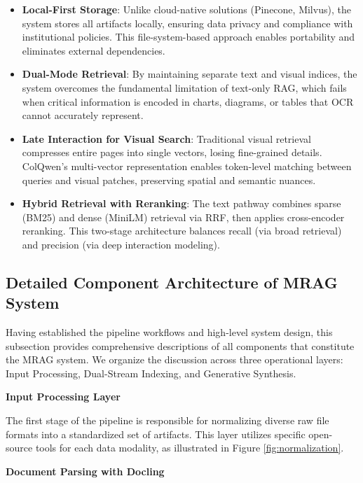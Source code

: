 \begin{itemize}
    \item \textbf{Local-First Storage}: Unlike cloud-native solutions (Pinecone, Milvus), the system stores all artifacts locally, ensuring data privacy and compliance with institutional policies. This file-system-based approach enables portability and eliminates external dependencies.
    
    \item \textbf{Dual-Mode Retrieval}: By maintaining separate text and visual indices, the system overcomes the fundamental limitation of text-only RAG, which fails when critical information is encoded in charts, diagrams, or tables that OCR cannot accurately represent.
    
    \item \textbf{Late Interaction for Visual Search}: Traditional visual retrieval compresses entire pages into single vectors, losing fine-grained details. ColQwen's multi-vector representation enables token-level matching between queries and visual patches, preserving spatial and semantic nuances.
    
    \item \textbf{Hybrid Retrieval with Reranking}: The text pathway combines sparse (BM25) and dense (MiniLM) retrieval via RRF, then applies cross-encoder reranking. This two-stage architecture balances recall (via broad retrieval) and precision (via deep interaction modeling).
\end{itemize}

\subsection{Detailed Component Architecture of MRAG System}

Having established the pipeline workflows and high-level system design, this subsection provides comprehensive descriptions of all components that constitute the MRAG system. We organize the discussion across three operational layers: Input Processing, Dual-Stream Indexing, and Generative Synthesis.

\textbf{Input Processing Layer}

The first stage of the pipeline is responsible for normalizing diverse raw file formats into a standardized set of artifacts. This layer utilizes specific open-source tools for each data modality, as illustrated in Figure \ref{fig:normalization}.

\textbf{Document Parsing with Docling}

